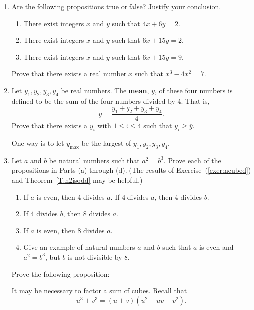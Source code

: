 \begin{enumerate}
\item Are the following propositions true or false?  Justify your conclusion. 
\label{exer:existintegers}%

  \begin{enumerate}
    \item There exist integers  $x$  and  $y$ such that  $4x + 6y = 2$.
    \item There exist integers  $x$  and  $y$ such that  $6x + 15y = 2$.
    \item There exist integers  $x$  and  $y$ such that  $6x + 15y = 9$.
  \end{enumerate}

\xitem Prove that there exists a real number  $x$  such that  $x^3  - 4x^2  = 7$.
\label{exer:IVT}%

\item Let  $y_1 , y_2 , y_3 , y_4 $ be  real numbers.  The \textbf{mean}, $\overline y $,  of these four numbers is defined to be the sum of the four numbers divided by 4.  That is,
\[
\overline y  = \frac{{y_1  + y_2  + y_3  + y_4 }}{4}.
\]
Prove that there exists a  $y_i $ with  $1 \leq i \leq 4$ such that  $y_i  \geq \overline y $.

\hint  One way is to let  $y_{\text{max}}$ be the largest of  
$y_1 , y_2 , y_3 , y_4 $.


\item  Let  $a$  and  $b$  be natural numbers such that  $a^2  = b^3 $.  Prove each of the propositions in 
Parts (a) through (d).  (The results of Exercise~(\ref{exer:ncubed}) and Theorem~\ref{T:n2isodd} may be helpful.)
\label{exer:sec32-16}%

\begin{enumerate}
  \item If  $a$  is even, then  4  divides  $a$. 
\label{exer:a2equalb3-a}%
  \yitem If  4  divides  $a$, then  4  divides  $b$.
  \item If  4  divides  $b$, then  8  divides  $a$.
  \item If  $a$  is even, then  8 divides  $a$.  
\label{exer:a2equalsb3-d}%
  \item Give an example of natural numbers  $a$  and  $b$  such that  $a$  is even and  $a^2  = b^3 $, but  $b$  is not divisible by  8.
\end{enumerate}

\xitem Prove the following proposition:
\label{exer:sec32-equation17}%
\hint It may be necessary to factor a sum  of cubes.  Recall that 
\[
u^3 + v^3 = \left( u + v \right) \left( u^2 - uv + v^2 \right).
\]


\end{enumerate}
